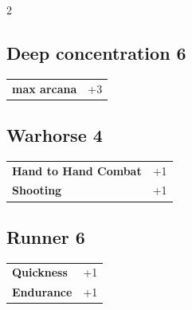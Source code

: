 \begin{multicols}{2}
\begin{tcolorbox}
    \subsection*{Deep concentration \hfill \small{6 }}
    \tcblower




\begin{tabular}{@{}ll@{}}
    \textbf{max arcana} & +3\\
\end{tabular}


\end{tcolorbox}

\begin{tcolorbox}
    \subsection*{Warhorse \hfill \small{4 }}
    \tcblower




\begin{tabular}{@{}ll@{}}
    \textbf{Hand to Hand Combat} & +1\\
    \textbf{Shooting} & +1\\
\end{tabular}


\end{tcolorbox}

\begin{tcolorbox}
    \subsection*{Runner \hfill \small{6 }}
    \tcblower




\begin{tabular}{@{}ll@{}}
    \textbf{Quickness} & +1\\
    \textbf{Endurance} & +1\\
\end{tabular}



\end{tcolorbox}
\end{multicols}
